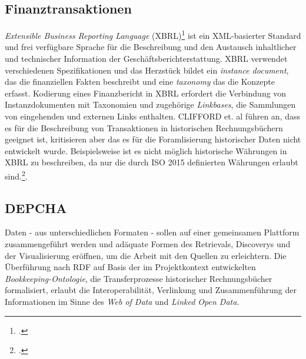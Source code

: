 \documentclass[12pt,a4paper]{article}
\begin{document}
\subsection{Finanztransaktionen}

\textit{Extensible Business Reporting Language }(XBRL)\footcite{engel2003extensible} ist ein XML-basierter Standard und frei verfügbare Sprache für die Beschreibung und den Austausch inhaltlicher und technischer Information der Geschäftsberichterstattung. XBRL verwendet verschiedenen Spezifikationen und das Herzstück bildet ein \textit{instance document}, das die finanziellen Fakten beschreibt und eine \textit{taxonomy} das die Konzepte erfasst. Kodierung eines Finanzbericht in XBRL erfordert die Verbindung von Instanzdokumenten mit Taxonomien und zugehörige \textit{Linkbases}, die Sammlungen von eingehenden und externen Links enthalten. CLIFFORD et. al führen an, dass es für die Beschreibung von Transaktionen in historischen Rechnungsbüchern geeignet ist, kritisieren aber das es für die Foramlisierung historischer Daten nicht entwickelt wurde. Beispielsweise ist es nicht möglich historische Währungen in XBRL zu beschreiben, da nur die durch ISO 2015 definierten Währungen erlaubt sind.\footcite[][S.7-9]{tomasekmedea}.

\subsection{DEPCHA}
\label{DEPCHA}

Daten - aus unterschiedlichen Formaten - sollen auf einer gemeinsamen Plattform zusammengeführt werden und adäquate Formen des Retrievals, Discoverys und der Visualisierung eröffnen, um die Arbeit mit den Quellen zu erleichtern. Die Überführung nach RDF auf Basis der im Projektkontext entwickelten \textit{Bookkeeping-Ontologie}, die Transferprozesse historischer Rechnungsbücher formalisiert, erlaubt die Interoperabilität, Verlinkung und Zusammenführung der Informationen im Sinne des \textit{Web of Data} und \textit{Linked Open Data}.
\end{document}
